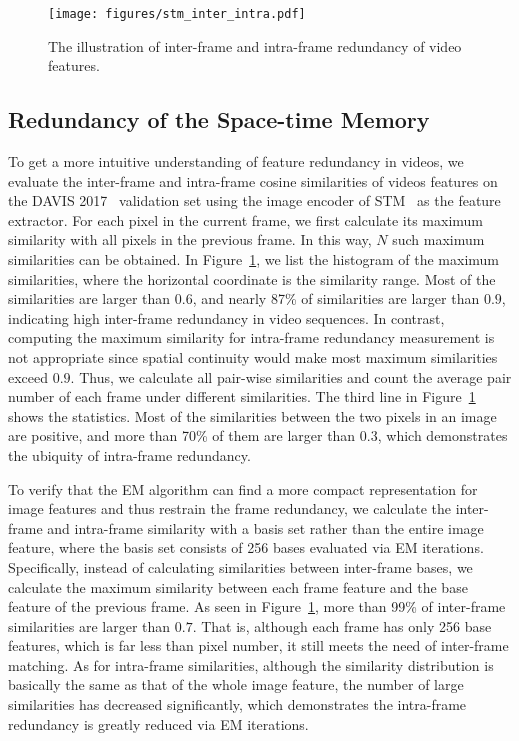 \begin{figure}
\begin{center}
\texttt{[image: figures/stm\_inter\_intra.pdf]}
\end{center}
\vspace{-0.5cm}
   \caption{The illustration of inter-frame and intra-frame redundancy of video features.}
\label{fig:inter_intra}
\vspace{-0.5cm}
\end{figure}

\subsection{Redundancy of the Space-time Memory}
To get a more intuitive understanding of feature redundancy in videos, we evaluate the inter-frame and intra-frame cosine similarities of videos features on the DAVIS 2017~\cite{pont20172017} validation set using the image encoder of STM~\cite{Oh_2019_ICCV} as the feature extractor. For each pixel in the current frame, we first calculate its maximum similarity with all pixels in the previous frame. In this way, $N$ such maximum similarities can be obtained. In Figure~\ref{fig:inter_intra}, we list the histogram of the maximum similarities, where the horizontal coordinate is the similarity range. Most of the similarities are larger than $0.6$, and nearly 87\% of similarities are larger than $0.9$, indicating high inter-frame redundancy in video sequences. In contrast, computing the maximum similarity for intra-frame redundancy measurement is not appropriate since spatial continuity would make most maximum similarities exceed $0.9$. Thus, we calculate all pair-wise similarities and count the average pair number of each frame under different similarities. The third line in Figure~\ref{fig:inter_intra} shows the statistics.  Most of the similarities between the two pixels in an image are positive, and more than 70\% of them are larger than $0.3$, which demonstrates the ubiquity of intra-frame redundancy.

To verify that the EM algorithm can find a more compact representation for image features and thus restrain the frame redundancy, we calculate the inter-frame and intra-frame similarity with a basis set rather than the entire image feature, where the basis set consists of 256 bases evaluated via EM iterations. Specifically, instead of calculating similarities between inter-frame bases, we calculate the maximum similarity between each frame feature and the base feature of the previous frame. As seen in Figure~\ref{fig:inter_intra}, more than 99\% of inter-frame similarities are larger than $0.7$. That is, although each frame has only 256 base features, which is far less than pixel number, it still meets the need of inter-frame matching. As for intra-frame similarities, although the similarity distribution is basically the same as that of the whole image feature, the number of large similarities has decreased significantly, which demonstrates the intra-frame redundancy is greatly reduced via EM iterations.

